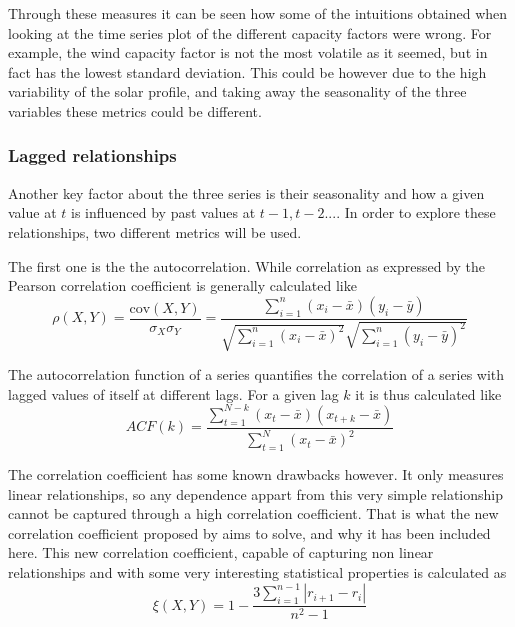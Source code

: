 Through these measures it can be seen how some of the intuitions obtained when looking at the time series plot of the different capacity factors were wrong. For example, the wind capacity factor is not the most volatile as it seemed, but in fact has the lowest standard deviation. This could be however due to the high variability of the solar profile, and taking away the seasonality of the three variables these metrics could be different.

\subsubsection{Lagged relationships}
Another key factor about the three series is their seasonality and how a given value at $t$ is influenced by past values at $t-1, t-2...$. In order to explore these relationships, two different metrics will be used. 

The first one is the the autocorrelation. While correlation as expressed by the Pearson correlation coefficient is generally calculated like
\begin{equation}
    \rho{\left(X,Y\right)}=\frac{\text{cov}\left(X,Y\right)}{\sigma_X\sigma_Y}=\frac{\sum^n_{i=1}\left(x_i-\bar{x}\right)\left(y_i-\bar{y}\right)}{\sqrt{\sum^n_{i=1}\left(x_i-\bar{x}\right)^2}\sqrt{\sum^n_{i=1}\left(y_i-\bar{y}\right)^2}}
\end{equation} 

The autocorrelation function of a series quantifies the correlation of a series with lagged values of itself at different lags. For a given lag $k$ it is thus calculated like
\begin{equation}
    \label{eq:acf}
    ACF\left(k\right)=\frac{\sum^{N-k}_{t=1}\left(x_t-\bar{x}\right)\left(x_{t+k}-\bar{x}\right)}{\sum^{N}_{t=1}\left(x_t-\bar{x}\right)^2}
\end{equation} 

The correlation coefficient has some known drawbacks however. It only measures linear relationships, so any dependence appart from this very simple relationship cannot be captured through a high correlation coefficient. That is what the new correlation coefficient proposed by \cite{correlation_2021} aims to solve, and why it has been included here. This new correlation coefficient, capable of capturing non linear relationships and with some very interesting statistical properties is calculated as 
\begin{equation}
    \xi{\left(X,Y\right)}=1-\frac{3\sum_{i=1}^{n-1}\left|r_{i+1}-r_i\right|}{n^2-1}
\end{equation}

